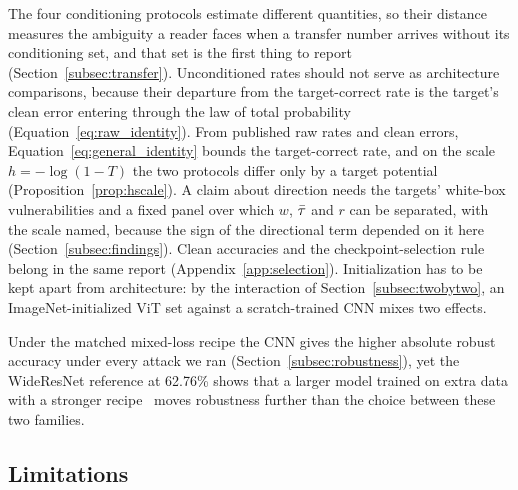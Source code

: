 The four conditioning protocols estimate different quantities, so their distance measures the ambiguity a reader faces when a transfer number arrives without its conditioning set, and that set is the first thing to report (Section~\ref{subsec:transfer}). Unconditioned rates should not serve as architecture comparisons, because their departure from the target-correct rate is the target's clean error entering through the law of total probability (Equation~\eqref{eq:raw_identity}). From published raw rates and clean errors, Equation~\eqref{eq:general_identity} bounds the target-correct rate, and on the scale $h=-\log(1-T)$ the two protocols differ only by a target potential (Proposition~\ref{prop:hscale}). A claim about direction needs the targets' white-box vulnerabilities and a fixed panel over which $w$, $\bar{\tau}$ and $r$ can be separated, with the scale named, because the sign of the directional term depended on it here (Section~\ref{subsec:findings}). Clean accuracies and the checkpoint-selection rule belong in the same report (Appendix~\ref{app:selection}). Initialization has to be kept apart from architecture: by the interaction of Section~\ref{subsec:twobytwo}, an ImageNet-initialized ViT set against a scratch-trained CNN mixes two effects.

Under the matched mixed-loss recipe the CNN gives the higher absolute robust accuracy under every attack we ran (Section~\ref{subsec:robustness}), yet the WideResNet reference at 62.76\% shows that a larger model trained on extra data with a stronger recipe~\cite{gowal2020uncovering} moves robustness further than the choice between these two families.

\subsection{Limitations}
\label{subsec:limitations}

